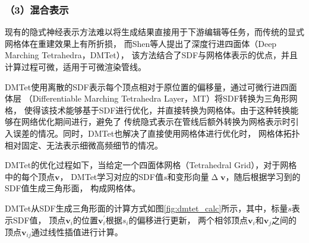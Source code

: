 \subsubsection*{（3）混合表示} 

现有的隐式神经表示方法难以将生成结果直接用于下游编辑等任务，而传统的显式网格体在重建效果上有所折损，
而Shen等人\cite{shen2021deep}提出了深度行进四面体（Deep Marching Tetrahedra，DMTet），
该方法结合了SDF与网格体表示的优点，并且计算过程可微，适用于可微渲染管线。

DMTet使用离散的SDF表示每个顶点相对于原位置的偏移量，通过可微行进四面体层
（Differentiable Marching Tetrahedra Layer，MT）将SDF转换为三角形网格，
使得该技术能够基于SDF进行优化，并直接转换为网格体。由于这种转换能够在网络优化期间进行，避免了
传统隐式表示在管线后额外转换为网格表示时引入误差的情况。同时，DMTet也解决了直接使用网格体进行优化时，
网格体拓扑相对固定、无法表示细微高频细节的情况。

DMTet的优化过程如下，当给定一个四面体网格（Tetrahedral Grid），对于网格中的每个顶点${\boldsymbol{v}}$，
DMTet学习对应的SDF值$s$和变形向量$\upDelta\boldsymbol{v}$，随后根据学习到的SDF值生成三角形面，
构成网格体。

DMTet从SDF生成三角形面的计算方式如图\ref{fig:dmtet_calc}所示，其中，标量$s$表示SDF值，
顶点${\boldsymbol{v}}_i$的位置${\boldsymbol{v}}_i^\prime$根据$s_i$的偏移进行更新，
两个相邻顶点${\boldsymbol{v}}_i$和${\boldsymbol{v}}_j$之间的顶点${\boldsymbol{v}}_{ij}$通过线性插值进行计算。

